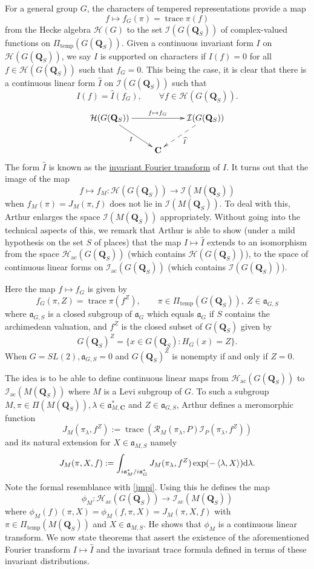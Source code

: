 \documentclass{ims9x6}
\def\C{\mathbf C}
\def\Q{\mathbf Q}
\def\HHH{\mathcal H}
\def\III{\mathcal I}
\def\aaa{\mathfrak a}
\def\d{\text d}
\def\RRR{\mathcal R}
\def\sprod#1#2{\left\langle #1 , #2 \right\rangle}  %
\def\trace{\operatorname{trace}}
\begin{document}
For a general group $G$, the characters of tempered representations provide a map
\[ f \mapsto f_G(\pi) = \trace \pi(f) \]
from the Hecke algebra $\HHH(G)$ to the set $\III(G(\Q_S))$ of complex-valued functions on $\Pi_{\text{temp}}(G(\Q_S))$. Given a continuous invariant form $I$ on $\HHH(G(\Q_S))$, we say $I$ is supported on characters if $I(f) = 0$ for all $f \in \HHH(G(\Q_S))$ such that $f_G = 0$. This being the case, it is clear that there is a continuous linear form $\widehat I$ on $\III(G(\Q_S))$ such that 
\[ I(f) = \widehat I(f_G), \qquad \forall f \in \HHH(G(\Q_S)). \]
\[ \xymatrix{ \HHH(G(\Q_S)) \ar[rr]^{f \mapsto f_G} \ar[dr]_I && \III(G(\Q_S)) \ar@{-->}[dl]^{\widehat I} \\ & \C & }
\]
The form $\widehat I$ is known as the \underline{invariant Fourier transform} of $I$. It turns out that the image of the map
\[ f \mapsto f_M : \HHH(G(\Q_S)) \to \III(M(\Q_S)) \]
when $f_M(\pi) = J_M(\pi, f)$ does not lie in $\III(M(\Q_S))$. To deal with this, Arthur enlarges the space $\III(M(\Q_S))$ appropriately. Without going into the technical aspects of this, we remark that Arthur is able to show (under a mild hypothesis on the set $S$ of places) that the map $I \mapsto \widehat I$ extends to an isomorphism from the space $\HHH_{\text{ac}}(G(\Q_S))$ (which contains $\HHH(G(\Q_S))$), to the space of continuous linear forms on $\III_{\text{ac}}(G(\Q_S))$ (which contains $\III(G(\Q_S))$).

Here the map $f \mapsto f_G$ is given by
\[ f_G(\pi, Z) = \trace \pi(f^Z), \qquad \pi \in \Pi_{\text{temp}}(G(\Q_S)), \ Z \in \aaa_{G, S} \]
where $\aaa_{G, S}$ is a closed subgroup of $\aaa_G$ which equals $\aaa_G$ if $S$ contains the archimedean valuation, and $f^Z$ is the closed subset of $G(\Q_S)$ given by
\[ G(\Q_S)^Z = \{ x \in G(\Q_S) : H_G(x) = Z \}. \]
When $G = SL(2), \aaa_{G, S} = 0$ and $G(\Q_S)^Z$ is nonempty if and only if $Z = 0$. 

The idea is to be able to define continuous linear maps from $\HHH_{\text{ac}}(G(\Q_S))$ to $\III_{\text{ac}}(M(\Q_S))$ where $M$ is a Levi subgroup of $G$. To such a subgroup $M, \pi \in \Pi(M(\Q_S)), \lambda \in \aaa_{M, \C}^*$ and $Z \in \aaa_{G, S}$, Arthur defines a meromorphic function
\begin{equation} \label{eq:jmpi}
J_M(\pi_\lambda, f^Z) := \trace \left( \RRR_M(\pi_\lambda, P) \III_P(\pi_\lambda, f^Z) \right)
\end{equation}
and its natural extension for $X \in \aaa_{M, S}$ namely
\[ J_M(\pi, X, f) := \int_{i\aaa_M^* / i\aaa_G^*} J_M(\pi_\lambda, f^Z) \exp(-\sprod{\lambda}{X}) \d \lambda. \]
Note the formal resemblance with \cref{jmpi}. Using this he defines the map
\[ \phi_M : \HHH_{\text{ac}}(G(\Q_S)) \to \III_{\text{ac}}(M(\Q_S)) \]
where $\phi_M(f)(\pi, X) = \phi_M(f, \pi, X) = J_M(\pi, X, f)$ with $\pi \in \Pi_{\text{temp}}(M(\Q_S))$ and $X \in \aaa_{M, S}$. He shows \cite{MR999488} that $\phi_M$ is a continuous linear transform. We now state theorems that assert the existence of the aforementioned Fourier transform $I \mapsto \widehat I$ and the invariant trace formula defined in terms of these invariant distributions. 
\end{document}
